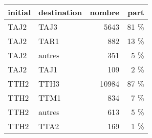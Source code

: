 \begin{tabular}{llrr}
\toprule
initial & destination &  nombre & part \\
\midrule
   TAJ2 &        TAJ3 &    5643 & 81 \% \\
   TAJ2 &        TAR1 &     882 & 13 \% \\
   TAJ2 &      autres &     351 &  5 \% \\
   TAJ2 &        TAJ1 &     109 &  2 \% \\
   TTH2 &        TTH3 &   10984 & 87 \% \\
   TTH2 &        TTM1 &     834 &  7 \% \\
   TTH2 &      autres &     613 &  5 \% \\
   TTH2 &        TTA2 &     169 &  1 \% \\
\bottomrule
\end{tabular}
